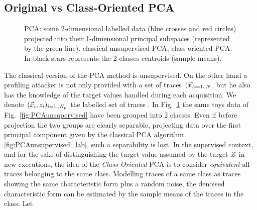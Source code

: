 \subsection{Original vs Class-Oriented PCA}
\begin{figure}[t]
\caption{PCA: some 2-dimensional labelled data (blue crosses and red circles) projected into their 1-dimensional principal subspaces (represented by the green line).  classical unsupervised PCA,  class-oriented PCA. In  black stars represents the 2 classes centroids (sample means).}\label{fig:2class-toys}
\end{figure}
The classical version of the PCA method is unsupervised.
On the other hand a profiling attacker is not only provided with a set of traces $(\vec{x})_{i=1..N}$, but he also has the knowledge of the target values handled during each acquisition. We denote $(\vec{x}_i, z_i)_{i=1..N_p}$ the labelled set of traces . In Fig.~\ref{fig:2class-toys} the same toys data of Fig.~\ref{fig:PCAunsupervised} have been grouped into 2 classes. Even if before projection the two groups are clearly separable, projecting data over the first principal component given by the classical PCA algorithm \ref{fig:PCAunsupervised_lab}, such a separability is lost. In the supervised context, and for the sake of distinguishing the target value assumed by the target $Z$ in new executions, the idea of the {\em Class-Oriented} PCA is to consider {\em equivalent} all traces belonging to the same class. Modelling traces of a same class as traces showing the same characteristic form plus a random noise, the denoised characteristic form can be estimated by the sample means of the traces in the class. Let 
